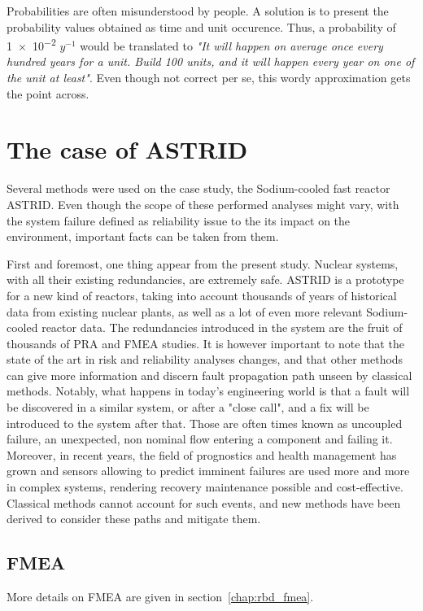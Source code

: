 Probabilities are often misunderstood by people. A solution is to present the probability values obtained as time and unit occurence. Thus, a probability of \num{1e-2} $y^{-1}$ would be translated to \textit{"It will happen on average once every hundred years for a unit. Build 100 units, and it will happen every year on one of the unit at least"}. Even though not correct per se, this wordy approximation gets the point across.

\section{The case of ASTRID}

Several methods were used on the case study, the Sodium-cooled fast reactor ASTRID. Even though the scope of these performed analyses might vary, with the system failure defined as reliability issue to the its impact on the environment, important facts can be taken from them.

First and foremost, one thing appear from the present study. Nuclear systems, with all their existing redundancies, are extremely safe. ASTRID is a prototype for a new kind of reactors, taking into account thousands of years of historical data from existing nuclear plants, as well as a lot of even more relevant Sodium-cooled reactor data. The redundancies introduced in the system are the fruit of thousands of PRA and FMEA studies. It is however important to note that the state of the art in risk and reliability analyses changes, and that other methods can give more information and discern fault propagation path unseen by classical methods. Notably, what happens in today's engineering world is that a fault will be discovered in a similar system, or after a "close call", and a fix will be introduced to the system after that. Those are often times known as uncoupled failure, an unexpected, non nominal flow entering a component and failing it. Moreover, in recent years, the field of prognostics and health management has grown and sensors allowing to predict imminent failures are used more and more in complex systems, rendering recovery maintenance possible and cost-effective. Classical methods cannot account for such events, and new methods have been derived to consider these paths and mitigate them.

\subsection{FMEA}

More details on FMEA are given in section~\ref{chap:rbd_fmea}.

